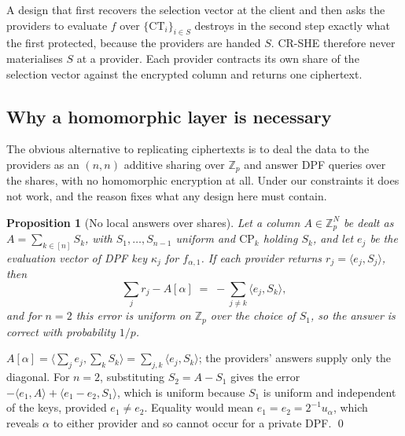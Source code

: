 \documentclass[a4paper,fleqn]{cas-sc}
\newtheorem{proposition}{Proposition}
\begin{document}
A design that first recovers the selection vector at the client and then asks
the providers to evaluate $f$ over $\{\text{CT}_i\}_{i\in S}$ destroys in the
second step exactly what the first protected, because the providers are handed
$S$. CR-SHE therefore never materialises $S$ at a provider. Each provider
contracts its own share of the selection vector against the encrypted column
and returns one ciphertext.

\subsection{Why a homomorphic layer is necessary}
\label{sec:whyrep}
The obvious alternative to replicating ciphertexts is to deal the data to the
providers as an $(n,n)$ additive sharing over $\mathbb{Z}_p$ and answer DPF
queries over the shares, with no homomorphic encryption at all. Under our
constraints it does not work, and the reason fixes what any design here must
contain.

\begin{proposition}[No local answers over shares]
\label{prop:nolocal}
Let a column $A\in\mathbb{Z}_p^N$ be dealt as $A=\sum_{k\in[n]}S_k$, with
$S_1,\dots,S_{n-1}$ uniform and $\text{CP}_k$ holding $S_k$, and let $e_j$ be
the evaluation vector of DPF key $\kappa_j$ for $f_{\alpha,1}$. If each
provider returns $r_j=\langle e_j,S_j\rangle$, then
\[
\textstyle\sum_{j} r_j - A[\alpha] \;=\; -\sum_{j\neq k}\langle e_j,S_k\rangle ,
\]
and for $n=2$ this error is uniform on $\mathbb{Z}_p$ over the choice of
$S_1$, so the answer is correct with probability $1/p$.
\end{proposition}
\begin{pf}
$A[\alpha]=\langle\sum_j e_j,\sum_k S_k\rangle=\sum_{j,k}\langle e_j,S_k\rangle$;
the providers' answers supply only the diagonal. For $n=2$, substituting
$S_2=A-S_1$ gives the error $-\langle e_1,A\rangle+\langle e_1-e_2,S_1\rangle$,
which is uniform because $S_1$ is uniform and independent of the keys, provided
$e_1\neq e_2$. Equality would mean $e_1=e_2=2^{-1}u_\alpha$, which reveals
$\alpha$ to either provider and so cannot occur for a private DPF. \qed
\end{pf}
\end{document}

